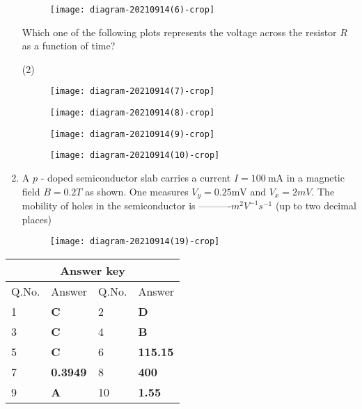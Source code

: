 \begin{enumerate}
	\begin{figure}[H]
		\centering
		\texttt{[image: diagram-20210914(6)-crop]}
	\end{figure}
	Which one of the following plots represents the voltage across the resistor $R$ as a function of time?
	{}
\begin{tasks}(2)
\task[\textbf{A.}] \begin{figure}[H]
	\centering
	\texttt{[image: diagram-20210914(7)-crop]}
\end{figure}
\task[\textbf{B.}] \begin{figure}[H]
	\centering
	\texttt{[image: diagram-20210914(8)-crop]}
\end{figure}
\task[\textbf{C.}] \begin{figure}[H]
	\centering
	\texttt{[image: diagram-20210914(9)-crop]}
\end{figure}
\task[\textbf{D.}] 
\begin{figure}[H]
	\centering
	\texttt{[image: diagram-20210914(10)-crop]}
\end{figure}
\end{tasks}
	\item A $p$ - doped semiconductor slab carries a current $I=100 \mathrm{~mA}$ in a magnetic field $B=0.2 T$ as shown. One measures $V_{y}=0.25 \mathrm{mV}$ and $V_{x}=2 m V .$ The mobility of holes in the semiconductor is ----------$m^{2} V^{-1} s^{-1}$ (up to two decimal places)
{	}
\begin{figure}[H]
\centering
\texttt{[image: diagram-20210914(19)-crop]}
\end{figure}
\end{enumerate}
\setlength\arrayrulewidth{1pt}
\begin{table}[H]
	\centering
	\begin{tabular}{|p{1.5cm}|p{1.5cm}||p{1.5cm}|p{1.5cm}|}
		\hline
		\multicolumn{4}{|c|}{\textbf{Answer key}}\\\hline\hline
		\rowcolor{ocrel}Q.No.&Answer&Q.No.&Answer\\\hline
		1&\textbf{C} &2&\textbf{D}\\\hline 
		3&\textbf{C} &4&\textbf{B} \\\hline
		5&\textbf{C} &6&\textbf{115.15} \\\hline
		7&\textbf{0.3949}&8&\textbf{400}\\\hline
		9&\textbf{A}&10&\textbf{1.55}\\\hline
	\end{tabular}
\end{table}